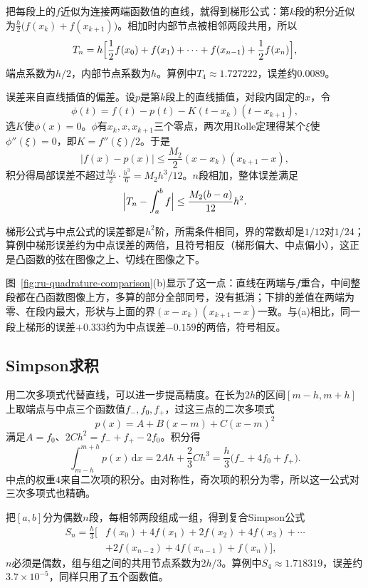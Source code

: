 把每段上的$f$近似为连接两端函数值的直线，就得到梯形公式：第$k$段的积分近似为$\frac h2\bigl(f(x_k)+f(x_{k+1})\bigr)$。相加时内部节点被相邻两段共用，所以
\begin{equation}
 T_n=h\Bigl[\frac12f(x_0)+f(x_1)+\cdots+f(x_{n-1})+\frac12f(x_n)\Bigr],
 \label{eq:ru-trapezoid-rule}
\end{equation}
端点系数为$h/2$，内部节点系数为$h$。算例中$T_4\approx1.727222$，误差约$0.0089$。

误差来自直线插值的偏差。设$p$是第$k$段上的直线插值，对段内固定的$x$，令
\[
 \phi(t)=f(t)-p(t)-K(t-x_k)(t-x_{k+1}),
\]
选$K$使$\phi(x)=0$。$\phi$有$x_k,x,x_{k+1}$三个零点，两次用Rolle定理得某个$\xi$使$\phi''(\xi)=0$，即$K=f''(\xi)/2$。于是
\[
 |f(x)-p(x)|\leq\frac{M_2}2(x-x_k)(x_{k+1}-x),
\]
积分得局部误差不超过$\frac{M_2}2\cdot\frac{h^3}6=M_2h^3/12$。$n$段相加，整体误差满足
\begin{equation}
 \Bigl|T_n-\int_a^bf\Bigr|\leq\frac{M_2(b-a)}{12}h^2.
 \label{eq:ru-trapezoid-error}
\end{equation}

梯形公式与中点公式的误差都是$h^2$阶，所需条件相同，界的常数却是$1/12$对$1/24$；算例中梯形误差约为中点误差的两倍，且符号相反（梯形偏大、中点偏小），这正是凸函数的弦在图像之上、切线在图像之下。

图~\ref{fig:ru-quadrature-comparison}(b)显示了这一点：直线在两端与$f$重合，中间整段都在凸函数图像上方，多算的部分全部同号，没有抵消；下排的差值在两端为零、在段内最大，形状与上面的界$(x-x_k)(x_{k+1}-x)$一致。与(a)相比，同一段上梯形的误差$+0.333$约为中点误差$-0.159$的两倍，符号相反。

\subsection{Simpson求积}
\label{sec:ru-simpson-rule}

用二次多项式代替直线，可以进一步提高精度。在长为$2h$的区间$[m-h,m+h]$上取端点与中点三个函数值$f_-,f_0,f_+$，过这三点的二次多项式
\[
 p(x)=A+B(x-m)+C(x-m)^2
\]
满足$A=f_0$、$2Ch^2=f_-+f_+-2f_0$。积分得
\[
 \int_{m-h}^{m+h}p(x)\,\mathrm dx=2Ah+\frac23Ch^3=\frac h3\bigl(f_-+4f_0+f_+\bigr).
\]
中点的权重$4$来自二次项的积分。由对称性，奇次项的积分为零，所以这一公式对三次多项式也精确。

把$[a,b]$分为偶数$n$段，每相邻两段组成一组，得到复合Simpson公式
\begin{equation}
 \begin{aligned}
 S_n=\frac h3\bigl[&f(x_0)+4f(x_1)+2f(x_2)+4f(x_3)+\cdots\\
 &+2f(x_{n-2})+4f(x_{n-1})+f(x_n)\bigr],
 \end{aligned}
 \label{eq:ru-simpson-rule}
\end{equation}
$n$必须是偶数，组与组之间的共用节点系数为$2h/3$。算例中$S_4\approx1.718319$，误差约$3.7\times10^{-5}$，同样只用了五个函数值。

